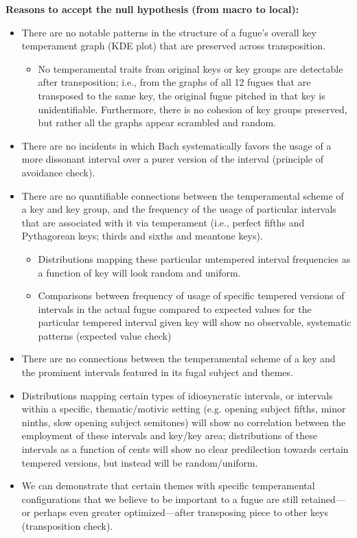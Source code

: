 \textbf{Reasons to accept the null hypothesis (from macro to local):}

\begin{itemize}
\tightlist
\item
  There are no notable patterns in the structure of a fugue's overall
  key temperament graph (KDE plot) that are preserved across
  transposition.

  \begin{itemize}
  \tightlist
  \item
    No temperamental traits from original keys or key groups are
    detectable after transposition; i.e., from the graphs of all 12
    fugues that are transposed to the same key, the original fugue
    pitched in that key is unidentifiable. Furthermore, there is no
    cohesion of key groups preserved, but rather all the graphs appear
    scrambled and random.
  \end{itemize}
\item
  There are no incidents in which Bach systematically favors the usage
  of a more dissonant interval over a purer version of the interval
  (principle of avoidance check).
\item
  There are no quantifiable connections between the temperamental scheme
  of a key and key group, and the frequency of the usage of particular
  intervals that are associated with it via temperament (i.e., perfect
  fifths and Pythagorean keys; thirds and sixths and meantone keys).

  \begin{itemize}
  \tightlist
  \item
    Distributions mapping these particular untempered interval
    frequencies as a function of key will look random and uniform.
  \item
    Comparisons between frequency of usage of specific tempered versions
    of intervals in the actual fugue compared to expected values for the
    particular tempered interval given key will show no observable,
    systematic patterns (expected value check)\\
  \end{itemize}
\item
  There are no connections between the temperamental scheme of a key and
  the prominent intervals featured in its fugal subject and themes.
\item
  Distributions mapping certain types of idiosyncratic intervals, or
  intervals within a specific, thematic/motivic setting (e.g. opening
  subject fifths, minor ninths, slow opening subject semitones) will
  show no correlation between the employment of these intervals and
  key/key area; distributions of these intervals as a function of cents
  will show no clear predilection towards certain tempered versions, but
  instead will be random/uniform.
\item
  We can demonstrate that certain themes with specific temperamental
  configurations that we believe to be important to a fugue are still
  retained---or perhaps even greater optimized---after
  transposing piece to other keys (transposition check).
\end{itemize}

